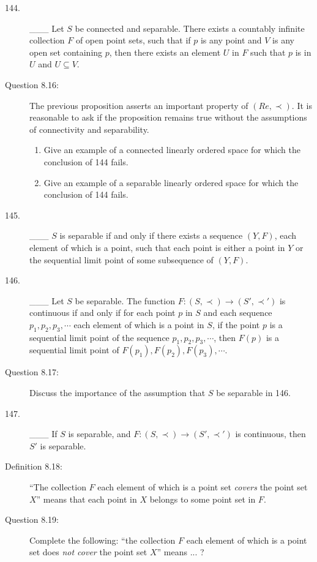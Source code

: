\documentclass{book}
\begin{document}
\begin{description}
\item[144.] \_\_\_ Let $S$ be connected and separable. There exists a countably infinite collection $F$ of open point sets, such that if $p$ is any point and $V$ is any open set containing $p$, then there exists an element $U$ in $F$ such that $p$ is in $U$ and $U \subseteq V$.

\item[Question 8.16:] The previous proposition asserts an important property of $(Re, \prec)$. It is reasonable to ask if the proposition remains true without the assumptions of connectivity and separability.
\begin{enumerate}[\hspace{1cm}(a)]
  \item Give an example of a connected linearly ordered space for which the conclusion of 144 fails.
  \item Give an example of a separable linearly ordered space for which the conclusion of 144 fails.
\end{enumerate}

\item[145.] \_\_\_ $S$ is separable if and only if there exists a sequence $(Y,F)$, each element of which is a point, such that each point is either a point in $Y$ or the sequential limit point of some subsequence of $(Y,F)$.

\item[146.] \_\_\_ Let $S$ be separable. The function $F: (S, \prec) \rightarrow (S', \prec ')$ is continuous if and only if for each point $p$ in $S$ and each sequence $p_{1}, p_{2}, p_{3}, \cdots$ each element of which is a point in $S$, if the point $p$ is a sequential limit point of the sequence $p_{1}, p_{2}, p_{3}, \cdots$, then $F(p)$ is a sequential limit point of $F(p_{1}), F(p_{2}), F(p_{3}), \cdots$.

\item[Question 8.17:] Discuss the importance of the assumption that $S$ be separable in 146.

\item[147.] \_\_\_ If $S$ is separable, and $F: (S, \prec) \rightarrow (S', \prec ')$ is continuous, then $S'$ is separable.

\item[Definition 8.18:] ``The collection $F$ each element of which is a point set \emph{covers} the point set $X$'' means that each point in $X$ belongs to some point set in $F$.

\item[Question 8.19:] Complete the following: ``the collection $F$ each element
of which is a point set does \emph{not cover} the point set $X$'' means ... ?


\end{description}
\end{document}
